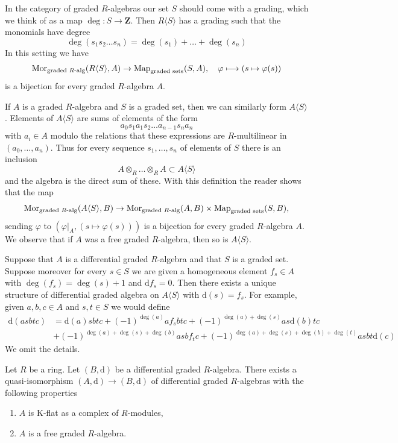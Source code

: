 \medskip\noindent
In the category of graded $R$-algebras our set $S$ should come
with a grading, which we think of as a map $\deg : S \to \mathbf{Z}$.
Then $R\langle S\rangle$ has a grading such that the monomials
have degree
$$
\deg(s_1 s_2 \ldots s_n) = \deg(s_1) + \ldots + \deg(s_n)
$$
In this setting we have
$$
\mathop{\mathrm{Mor}}\nolimits_{\text{graded }R\text{-alg}}(R\langle S \rangle, A) \to
\text{Map}_{\text{graded sets}}(S, A),\quad
\varphi \longmapsto (s \mapsto \varphi(s))
$$
is a bijection for every graded $R$-algebra $A$.

\medskip\noindent
If $A$ is a graded $R$-algebra and $S$ is a graded set,
then we can similarly form $A\langle S \rangle$.
Elements of $A\langle S \rangle$ are
sums of elements of the form
$$
a_0 s_1 a_1 s_2 \ldots a_{n - 1} s_n a_n
$$
with $a_i \in A$ modulo the relations that these expressions
are $R$-multilinear in $(a_0, \ldots, a_n)$.
Thus for every sequence $s_1, \ldots, s_n$ of elements of $S$
there is an inclusion
$$
A \otimes_R \ldots \otimes_R A \subset A\langle S \rangle
$$
and the algebra is the direct sum of these. With this definition the
reader shows that the map
$$
\mathop{\mathrm{Mor}}\nolimits_{\text{graded }R\text{-alg}}(A\langle S \rangle, B) \to
\mathop{\mathrm{Mor}}\nolimits_{\text{graded }R\text{-alg}}(A, B) \times
\text{Map}_{\text{graded sets}}(S, B),
$$
sending $\varphi$ to $(\varphi|_A, (s \mapsto \varphi(s)))$
is a bijection for every graded $R$-algebra $A$.
We observe that if $A$ was a free graded $R$-algebra,
then so is $A\langle S \rangle$.

\medskip\noindent
Suppose that $A$ is a differential graded $R$-algebra and
that $S$ is a graded set. Suppose moreover for every $s \in S$
we are given a homogeneous element $f_s \in A$ with $\deg(f_s) = \deg(s) + 1$
and $\text{d}f_s = 0$. Then there exists a unique structure of
differential graded algebra on $A\langle S \rangle$ with
$\text{d}(s) = f_s$. For example, given $a, b, c \in A$ and
$s, t \in S$ we would define
\begin{align*}
\text{d}(asbtc)
& =
\text{d}(a)sbtc + (-1)^{\deg(a)}a f_s b t c +
(-1)^{\deg(a) + \deg(s)} as\text{d}(b)tc \\
& + (-1)^{\deg(a) + \deg(s) + \deg(b)} asb f_t c +
(-1)^{\deg(a) + \deg(s) + \deg(b) + \deg(t)} asbt\text{d}(c)
\end{align*}
We omit the details.

\begin{lemma}
\label{lemma-K-flat-resolution}
Let $R$ be a ring. Let $(B, \text{d})$ be a differential graded $R$-algebra.
There exists a quasi-isomorphism $(A, \text{d}) \to (B, \text{d})$ of
differential graded $R$-algebras with the following properties
\begin{enumerate}
\item $A$ is K-flat as a complex of $R$-modules,
\item $A$ is a free graded $R$-algebra.
\end{enumerate}
\end{lemma}

